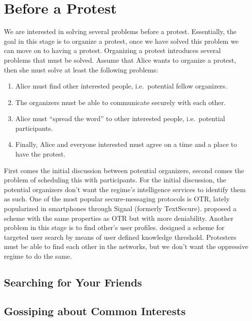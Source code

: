 \section{Before a Protest}
\label{BeforeProtest}

We are interested in solving several problems before a protest.
Essentially, the goal in this stage is to organize a protest, once we have 
solved this problem we can move on to having a protest.
Organizing a protest introduces several problems that must be solved.
Assume that Alice wants to organize a protest, then she must solve at least the 
following problems:
\begin{enumerate}
  \item Alice must find other interested people, i.e.\ potential fellow 
    organizers.
  \item The organizers must be able to communicate securely with each other.
  \item Alice must \enquote{spread the word} to other interested people, i.e.\ 
    potential participants.
  \item Finally, Alice and everyone interested must agree on a time and a place
    to have the protest.
\end{enumerate}

First comes the initial discussion between potential organizers, second comes 
the problem of scheduling this with participants.
For the initial discussion, the potential organizers don't want the regime's 
intelligence services to identify them as such.
One of the most popular secure-messaging protocols is \ac{OTR}, lately 
popularized in smartphones through Signal (formerly TextSecure).
\citet{OTPKX} proposed a scheme with the same properties as \ac{OTR} but with 
more deniability.
Another problem in this stage is to find other's user profiles.
\citet{ThresholdUserSearch} designed a scheme for targeted user search by means 
of user defined knowledge threshold.
Protesters must be able to find each other in the networks, but we don't want 
the oppressive regime to do the same.

\subsection{Searching for Your Friends}
\label{UserSearch}



\subsection{Gossiping about Common Interests}
\label{Gossple}

